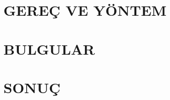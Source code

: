 \documentclass[11pt]{article}
\begin{document}


\section{GEREÇ VE YÖNTEM} 



\clearpage

\section{BULGULAR}

\noindent




\clearpage

\section{SONUÇ}




\sectionfont{\raggedright}
{\small 



}
\end{document}
